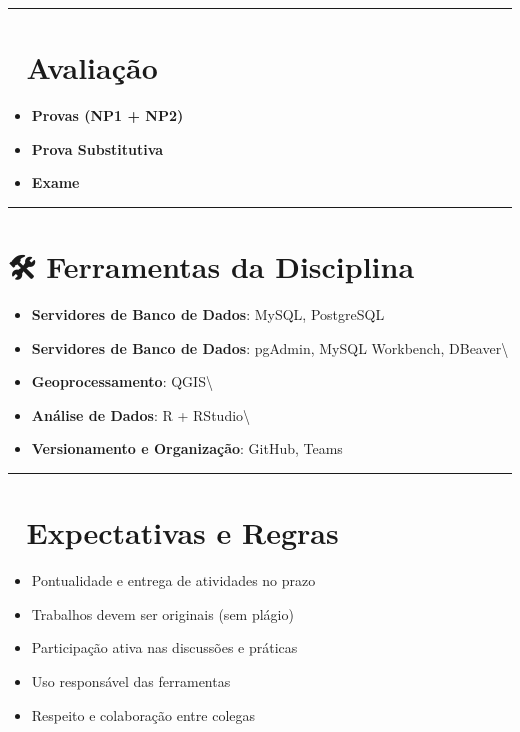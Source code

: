 \documentclass[
]{book}
\providecommand{\tightlist}{%
  \setlength{\itemsep}{0pt}\setlength{\parskip}{0pt}}
\begin{document}
\begin{center}\rule{0.5\linewidth}{0.5pt}\end{center}

\section{📝 Avaliação}\label{avaliauxe7uxe3o}

\begin{itemize}
\tightlist
\item
  \textbf{Provas (NP1 + NP2)}
\item
  \textbf{Prova Substitutiva}
\item
  \textbf{Exame}
\end{itemize}

\begin{center}\rule{0.5\linewidth}{0.5pt}\end{center}

\section{🛠️ Ferramentas da Disciplina}\label{ferramentas-da-disciplina}

\begin{itemize}
\tightlist
\item
  \textbf{Servidores de Banco de Dados}: MySQL, PostgreSQL
\item
  \textbf{Servidores de Banco de Dados}: pgAdmin, MySQL Workbench, DBeaver\textbackslash{}
\item
  \textbf{Geoprocessamento}: QGIS\textbackslash{}
\item
  \textbf{Análise de Dados}: R + RStudio\textbackslash{}
\item
  \textbf{Versionamento e Organização}: GitHub, Teams
\end{itemize}

\begin{center}\rule{0.5\linewidth}{0.5pt}\end{center}

\section{📌 Expectativas e Regras}\label{expectativas-e-regras}

\begin{itemize}
\tightlist
\item
  Pontualidade e entrega de atividades no prazo
\item
  Trabalhos devem ser originais (sem plágio)
\item
  Participação ativa nas discussões e práticas
\item
  Uso responsável das ferramentas
\item
  Respeito e colaboração entre colegas
\end{itemize}
\end{document}
